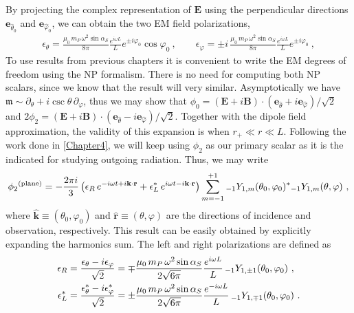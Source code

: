 By projecting the complex representation of $\mathbf{E}$ using the perpendicular directions $\mathbf{e}_{\hat{\theta}_0}$ and $\mathbf{e}_{\hat{\varphi}_0}$, we can obtain the two EM field polarizations,
\begin{align}
    \epsilon_{\theta} = \frac{\mu_0 \,m_P \,\omega^2 \sin\alpha_S}{8 \pi} \frac{e^{i \omega L}}{L} e^{\pm i \varphi_0} \cos\varphi_0 ~,\qquad
    \epsilon_{\varphi} = \pm i\, \frac{\mu_0 \,m_P \,\omega^2 \sin\alpha_S}{8 \pi} \frac{e^{i \omega L}}{L} e^{\pm i \varphi_0} ~,
\end{align}
To use results from previous chapters it is convenient to write the EM degrees of freedom using the NP formalism.
There is no need for computing both NP scalars, since we know that the result will very similar.
Asymptotically we have $\mathfrak{m}\sim \partial_\theta + i \csc\theta \,\partial_\varphi$, thus we may show that $\phi_0 = (\mathbf{E} + i \mathbf{B}) \cdot (\mathbf{e}_{\hat{\theta}} + i \mathbf{e}_{\hat{\varphi}} )/\sqrt{2}$ and $2\phi_2 = (\mathbf{E} + i \mathbf{B}) \cdot (\mathbf{e}_{\hat{\theta}} - i \mathbf{e}_{\hat{\varphi}} )/\sqrt{2}$.
Together with the dipole field approximation, the validity of this expansion is when $r_{+} \ll r \ll L$.
Following the work done in \cref{Chapter4}, we will keep using $\phi_2$ as our primary scalar as it is the indicated for studying outgoing radiation.
Thus, we may write
\begin{align}
    \label{eq5:phi2plane}
    \phi_2{}^{(\mathrm{plane})} = - \frac{2 \pi i }{3} \left( \epsilon_R \,e^{-i \omega t + i \mathbf{k}\cdot\mathbf{r}} + \epsilon_L^* \,e^{i \omega t - i \mathbf{k}\cdot\mathbf{r}} \right) \sum_{m=-1}^{+1} \uu[-1]{Y}{1,m}(\theta_0,\varphi_0)^{*} \uu[-1]{Y}{1,m}(\theta,\varphi) ~,
\end{align}
where $\mathbf{\hat{k}}\equiv(\theta_0,\varphi_0)$ and $\mathbf{\hat{r}}\equiv(\theta,\varphi)$ are the directions of incidence and observation, respectively.
This result can be easily obtained by explicitly expanding the harmonics sum.
The left and right polarizations are defined as
\begin{align}
    \begin{split}
        \epsilon_R &= \frac{\epsilon_{\theta} - i \epsilon_{\varphi}}{\sqrt{2}}
        = \mp \frac{\mu_0 \,m_P \,\omega^2 \sin\alpha_S}{2\sqrt{6\pi}} 
        \frac{e^{i\omega L}}{L} \,\uu[-1]{Y}{1,\pm 1}(\theta_0,\varphi_0) ~, \\
        \epsilon_L^* &= \frac{\epsilon_{\theta}^* - i \epsilon_{\varphi}^*}{\sqrt{2}} =
        \pm \frac{\mu_0 \,m_P \,\omega^2 \sin\alpha_S}{2\sqrt{6\pi}}
        \frac{e^{-i\omega L}}{L} \,\uu[-1]{Y}{1,\mp 1}(\theta_0,\varphi_0) ~.
    \end{split}
\end{align}

